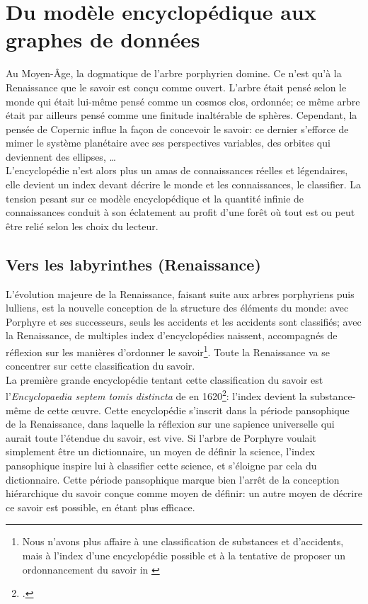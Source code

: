 \section{\label{III-A-1}Du modèle encyclopédique aux graphes de données}

Au Moyen-Âge, la dogmatique de l'arbre porphyrien domine. Ce n'est qu'à la Renaissance que le savoir est conçu comme ouvert. L'arbre était pensé selon le monde qui était lui-même pensé comme un cosmos clos, ordonnée; ce même arbre était par ailleurs pensé comme une finitude inaltérable de sphères. Cependant, la pensée de Copernic influe la façon de concevoir le savoir: ce dernier s'efforce de mimer le système planétaire avec ses perspectives variables, des orbites qui deviennent des ellipses, \dots~\\

L'encyclopédie n'est alors plus un amas de connaissances réelles et légendaires, elle devient un index devant décrire le monde et les connaissances, le classifier. La tension pesant sur ce modèle encyclopédique et la quantité infinie de connaissances conduit à son éclatement au profit d'une forêt où tout est ou peut être relié selon les choix du lecteur.

\subsection{\label{III-A-1-a}Vers les labyrinthes (Renaissance)}

L'évolution majeure de la Renaissance, faisant suite aux arbres porphyriens puis lulliens, est la nouvelle conception de la structure des éléments du monde: avec Porphyre et ses successeurs, seuls les accidents et les accidents sont classifiés; avec la Renaissance, de multiples index d'encyclopédies naissent, accompagnés de réflexion sur les manières d'ordonner le savoir\footnote{\og Nous n'avons plus affaire à une classification de substances et d'accidents, mais à l'index d'une encyclopédie possible et à la tentative de proposer un ordonnancement du savoir\fg{} in \cite{eco_arbre_2010}}. Toute la Renaissance va se concentrer sur cette classification du savoir.\\

La première grande encyclopédie tentant cette classification du savoir est l'\textit{Encyclopaedia septem tomis distincta} de  en 1620\footcite{alsted_encyclopaedia_1630}: l'index devient la substance-même de cette œuvre. Cette encyclopédie s'inscrit dans la période pansophique de la Renaissance, dans laquelle la réflexion sur une sapience universelle qui aurait toute l'étendue du savoir, est vive. Si l'arbre de Porphyre voulait simplement être un dictionnaire, un moyen de définir la science, l'index pansophique inspire lui à classifier cette science, et s'éloigne par cela du dictionnaire. Cette période pansophique marque bien l'arrêt de la conception hiérarchique du savoir conçue comme moyen de définir: un autre moyen de décrire ce savoir est possible, en étant plus efficace.\\

